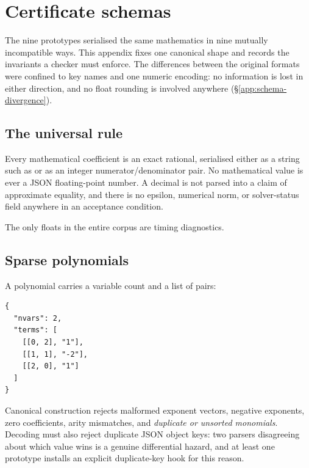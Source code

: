 \section{Certificate schemas}
\label{app:schemas}

The nine prototypes serialised the same mathematics in nine mutually
incompatible ways. This appendix fixes one canonical shape and records the
invariants a checker must enforce. The differences between the original formats
were confined to key names and one numeric encoding: no information is lost in
either direction, and no float rounding is involved anywhere
(\S\ref{app:schema-divergence}).

\subsection{The universal rule}

\begin{invariant}
Every mathematical coefficient is an exact rational, serialised either as a
string such as  or as an integer numerator/denominator pair.
No mathematical value is ever a JSON floating-point number. A decimal is not
parsed into a claim of approximate equality, and there is no epsilon, numerical
norm, or solver-status field anywhere in an acceptance condition.
\end{invariant}

The only floats in the entire corpus are timing diagnostics.

\subsection{Sparse polynomials}

A polynomial carries a variable count and a list of
 pairs:

\begin{lstlisting}
{
  "nvars": 2,
  "terms": [
    [[0, 2], "1"],
    [[1, 1], "-2"],
    [[2, 0], "1"]
  ]
}
\end{lstlisting}

Canonical construction rejects malformed exponent vectors, negative exponents,
zero coefficients, arity mismatches, and \emph{duplicate or unsorted monomials}.
Decoding must also reject duplicate JSON object keys: two parsers disagreeing
about which value wins is a genuine differential hazard, and at least one
prototype installs an explicit duplicate-key hook for this reason.

